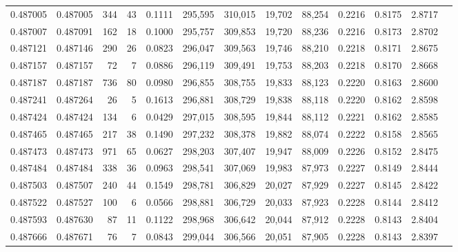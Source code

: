 \begin{tabular}{rrrrrrrrrrrrr}
0.487005 & 0.487005 &   344 &    43 &                                     0.1111 & 295,595 & 310,015 &  19,702 &  88,254 & 0.2216 & 0.8175 & 2.8717 \\
0.487007 & 0.487091 &   162 &    18 &                                     0.1000 & 295,757 & 309,853 &  19,720 &  88,236 & 0.2216 & 0.8173 & 2.8702 \\
0.487121 & 0.487146 &   290 &    26 &                                     0.0823 & 296,047 & 309,563 &  19,746 &  88,210 & 0.2218 & 0.8171 & 2.8675 \\
0.487157 & 0.487157 &    72 &     7 &                                     0.0886 & 296,119 & 309,491 &  19,753 &  88,203 & 0.2218 & 0.8170 & 2.8668 \\
0.487187 & 0.487187 &   736 &    80 &                                     0.0980 & 296,855 & 308,755 &  19,833 &  88,123 & 0.2220 & 0.8163 & 2.8600 \\
0.487241 & 0.487264 &    26 &     5 &                                     0.1613 & 296,881 & 308,729 &  19,838 &  88,118 & 0.2220 & 0.8162 & 2.8598 \\
0.487424 & 0.487424 &   134 &     6 &                                     0.0429 & 297,015 & 308,595 &  19,844 &  88,112 & 0.2221 & 0.8162 & 2.8585 \\
0.487465 & 0.487465 &   217 &    38 &                                     0.1490 & 297,232 & 308,378 &  19,882 &  88,074 & 0.2222 & 0.8158 & 2.8565 \\
0.487473 & 0.487473 &   971 &    65 &                                     0.0627 & 298,203 & 307,407 &  19,947 &  88,009 & 0.2226 & 0.8152 & 2.8475 \\
0.487484 & 0.487484 &   338 &    36 &                                     0.0963 & 298,541 & 307,069 &  19,983 &  87,973 & 0.2227 & 0.8149 & 2.8444 \\
0.487503 & 0.487507 &   240 &    44 &                                     0.1549 & 298,781 & 306,829 &  20,027 &  87,929 & 0.2227 & 0.8145 & 2.8422 \\
0.487522 & 0.487527 &   100 &     6 &                                     0.0566 & 298,881 & 306,729 &  20,033 &  87,923 & 0.2228 & 0.8144 & 2.8412 \\
0.487593 & 0.487630 &    87 &    11 &                                     0.1122 & 298,968 & 306,642 &  20,044 &  87,912 & 0.2228 & 0.8143 & 2.8404 \\
0.487666 & 0.487671 &    76 &     7 &                                     0.0843 & 299,044 & 306,566 &  20,051 &  87,905 & 0.2228 & 0.8143 & 2.8397 \\

\end{tabular}
